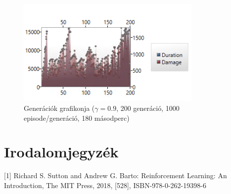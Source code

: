 \documentclass[12pt]{article}
\begin{document}
\begin{figure}[H]
	\begin{center}
		\includegraphics[width=0.8\textwidth]{200gen1000ep}
	\end{center}
	\caption{Generációk grafikonja ($\gamma = 0.9$, 200 generáció, 1000 episode/generáció, 180 másodperc)}
	\label{fig:200gen1000ep}
\end{figure}


\pagebreak

\section{Irodalomjegyzék}

[1] Richard S. Sutton and Andrew G. Barto: Reinforcement Learning: An Introduction, The MIT Press, 2018, [528], ISBN-978-0-262-19398-6
\end{document}
